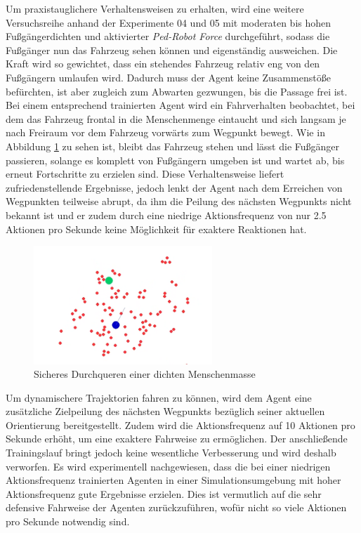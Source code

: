Um praxistauglichere Verhaltensweisen zu erhalten, wird eine weitere Versuchsreihe
anhand der Experimente 04 und 05 mit moderaten bis hohen Fußgängerdichten und aktivierter
\emph{Ped-Robot Force} durchgeführt, sodass die Fußgänger nun das Fahrzeug sehen können
und eigenständig ausweichen. Die Kraft wird so gewichtet, dass ein stehendes Fahrzeug
relativ eng von den Fußgängern umlaufen wird. Dadurch muss der Agent keine Zusammenstöße
befürchten, ist aber zugleich zum Abwarten gezwungen, bis die Passage frei ist. Bei einem
entsprechend trainierten Agent wird ein Fahrverhalten beobachtet, bei dem das Fahrzeug
frontal in die Menschenmenge eintaucht und sich langsam je nach Freiraum vor dem
Fahrzeug vorwärts zum Wegpunkt bewegt. Wie in Abbildung \ref{fig:DiveIntoCrowd} zu
sehen ist, bleibt das Fahrzeug stehen und lässt die Fußgänger passieren, solange
es komplett von Fußgängern umgeben ist und wartet ab, bis erneut Fortschritte
zu erzielen sind. Diese Verhaltensweise liefert zufriedenstellende Ergebnisse,
jedoch lenkt der Agent nach dem Erreichen von Wegpunkten teilweise abrupt, da ihm
die Peilung des nächsten Wegpunkts nicht bekannt ist und er zudem durch eine niedrige
Aktionsfrequenz von nur 2.5 Aktionen pro Sekunde keine Möglichkeit für exaktere
Reaktionen hat.\\

\begin{figure}[h]
  \centering
  \includegraphics[width = 0.6\textwidth]{imgs/eintauchen_in_menschenmasse}
  \caption{Sicheres Durchqueren einer dichten Menschenmasse}
  \label{fig:DiveIntoCrowd}
\end{figure}

Um dynamischere Trajektorien fahren zu können, wird dem Agent eine zusätzliche
Zielpeilung des nächsten Wegpunkts bezüglich seiner aktuellen Orientierung
bereitgestellt. Zudem wird die Aktionsfrequenz auf 10 Aktionen pro Sekunde erhöht,
um eine exaktere Fahrweise zu ermöglichen. Der anschließende Trainingslauf bringt
jedoch keine wesentliche Verbesserung und wird deshalb verworfen. Es wird experimentell
nachgewiesen, dass die bei einer niedrigen Aktionsfrequenz trainierten Agenten in einer
Simulationsumgebung mit hoher Aktionsfrequenz gute Ergebnisse erzielen. Dies ist
vermutlich auf die sehr defensive Fahrweise der Agenten zurückzuführen, wofür nicht
so viele Aktionen pro Sekunde notwendig sind.\\

